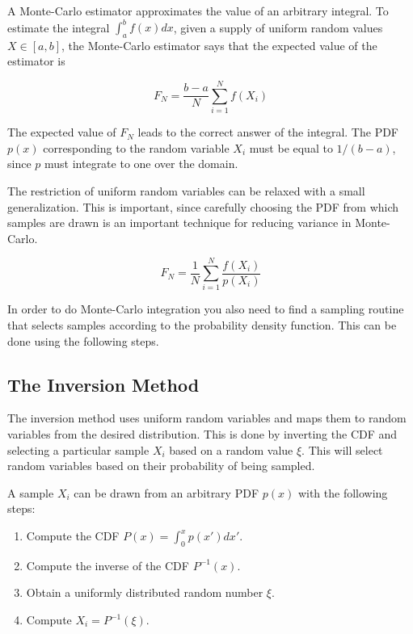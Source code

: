 A Monte-Carlo estimator approximates the value of an arbitrary integral. To estimate the integral $\int_a^b f(x) dx$, given a supply of uniform random values $X \in [a, b]$, the Monte-Carlo estimator says that the expected value of the estimator is

\begin{equation}
F_N = \frac{b-a}{N} \sum_{i=1}^{N} f(X_i)
\end{equation}

The expected value of $F_N$ leads to the correct answer of the integral. The PDF $p(x)$ corresponding to the random variable $X_i$ must be equal to $1/(b-a)$, since $p$ must integrate to one over the domain.

The restriction of uniform random variables can be relaxed with a small generalization. This is important, since carefully choosing the PDF from which samples are drawn is an important technique for reducing variance in Monte-Carlo.

\begin{equation}
F_N = \frac{1}{N} \sum_{i=1}^{N} \frac{f(X_i)}{p(X_i)}
\end{equation}

In order to do Monte-Carlo integration you also need to find a sampling routine that selects samples according to the probability density function. This can be done using the following steps.

\subsection{The Inversion Method}
The inversion method uses uniform random variables and maps them to random variables from the desired distribution. This is done by inverting the CDF and selecting a particular sample $X_i$ based on a random value $\xi$. This will select random variables based on their probability of being sampled.

A sample $X_i$ can be drawn from an arbitrary PDF $p(x)$ with the following steps:

\begin{enumerate}
\item Compute the CDF $P(x) = \int_0^x p(x') dx'$.
\item Compute the inverse of the CDF $P^{-1}(x)$.
\item Obtain a uniformly distributed random number $\xi$.
\item Compute $X_i = P^{-1}(\xi)$.
\end{enumerate}

